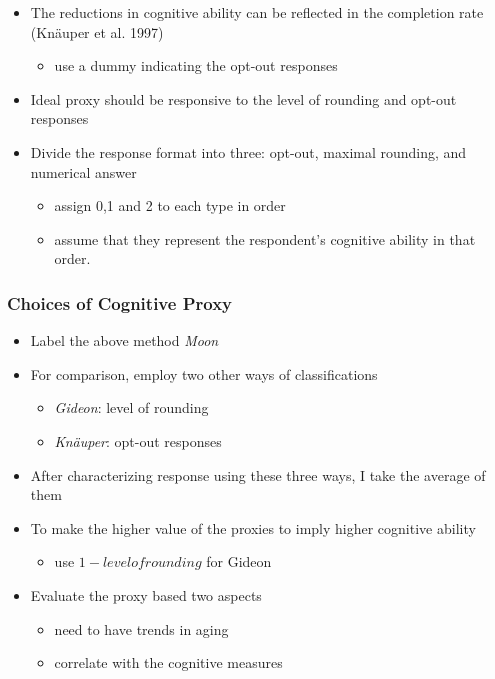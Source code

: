 \documentclass[10pt,svgnames,fragile]{beamer}
\begin{document}
{\begin{frame}[label=Framework2]
\begin{itemize}
\begin{itemize}
\begin{itemize}
		\end{itemize}
		\end{itemize}
		\vfill
		\item The reductions in cognitive ability can be reflected in the completion rate (Kn{\"a}uper  et al. 1997)
		\begin{itemize}
			\item use a dummy indicating the opt-out responses \hyperlink{figure4}{}
			
		\end{itemize}
		\vfill
		\item Ideal proxy should be responsive to the level of rounding and opt-out responses
		\vfill
		\item Divide the response format into three: opt-out, maximal rounding, and numerical answer
		\begin{itemize}
			\item assign 0,1 and 2 to each type in order
			\item assume that they represent the respondent’s cognitive ability in that order.
		\end{itemize}
		\vfill
	\end{itemize}
\end{frame}



\begin{frame}
	\frametitle{Choices of Cognitive Proxy} 
	\begin{itemize}
		\item Label the above method \textit{Moon}
		\item For comparison, employ two other ways of classifications
		\begin{itemize}
			\item \textit{Gideon}: level of rounding
			\item \textit{Kn{\"a}uper}: opt-out responses
		\end{itemize}
	\item After characterizing response using these three ways, I take the average of them
	\item To make the higher value of the proxies to imply higher cognitive ability
	\begin{itemize}
		\item use $1-level of rounding$ for Gideon
	\end{itemize}
	\item Evaluate the proxy based two aspects
			\begin{itemize}
		\item need to have trends in aging
		\item correlate with the cognitive measures
	\end{itemize}
	\end{itemize}
\end{frame}

}
\end{document}
